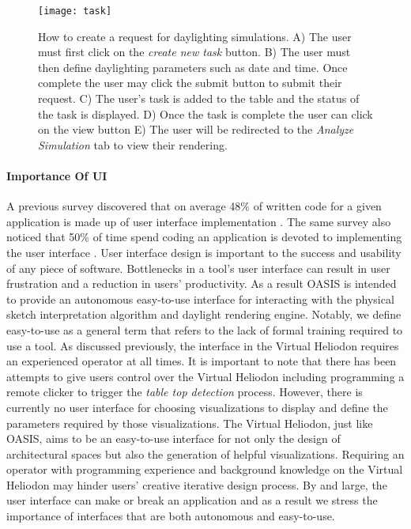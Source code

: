 \begin{figure}[!ht]
\centering
\texttt{[image: task]}
\caption[How to create a request for daylighting simulations.]{How to create a request for daylighting simulations. 
A) The user must first click on the \textit{create new task} button.
B) The user must then define daylighting parameters such as date and time. Once complete the user may click the submit button to submit their request.
C) The user's task is added to the table and the status of the task is displayed.
D) Once the task is complete the user can click on the view button
E) The user will be redirected to the \textit{Analyze Simulation} tab to view their rendering.
}
\label{fig:task}
\end{figure}

\clearpage

\paragraph{Importance Of UI}\label{ui_importance}
A previous survey discovered that on average 48\% of written code for a given application is made up of user interface implementation \cite{Myers1992}.  The same survey also noticed that 50\% of time spend coding an application is devoted to implementing the user interface \cite{Myers1992}.  User interface design is important to the success and usability of any piece of software.  Bottlenecks in a tool's user interface can result in user frustration and a reduction in users' productivity.  As a result OASIS is intended to provide an autonomous easy-to-use interface for interacting with the physical sketch interpretation algorithm and daylight rendering engine.  Notably, we define easy-to-use  as a general term that refers to the lack of formal training required to use a tool.  As discussed previously, the interface in the Virtual Heliodon requires an experienced operator at all times.  It is important to note that there has been attempts to give users control over the Virtual Heliodon including programming a remote clicker to trigger the \textit{table top detection} process.  However, there is currently no user interface for choosing visualizations to display and define the parameters required by those visualizations.  The Virtual Heliodon, just like OASIS, aims to be an easy-to-use interface for not only the design of architectural spaces but also the generation of helpful visualizations.  Requiring an operator with programming experience and background knowledge on the Virtual Heliodon may hinder users' creative iterative design process.  By and large, the user interface can make or break an application and as a result we stress the importance of interfaces that are both autonomous and easy-to-use.  \\ 

